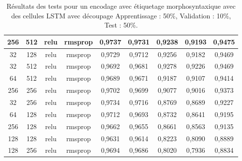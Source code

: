 \begin{table}[H]
{\begin{tabular}{|c|c|c|c|c|c|c|c|c|}
				256 & 512 & relu & rmsprop & 0,9737 & 0,9731 & 0,9238 & 0,9193 & 0,9475 \\ \hline
				32 & 128 & relu & rmsprop & 0,9729 & 0,9712 & 0,9256 & 0,9182 & 0,9469 \\ \hline
				32 & 512 & relu & rmsprop & 0,9692 & 0,9681 & 0,9278 & 0,9226 & 0,9469 \\ \hline
				64 & 512 & relu & rmsprop & 0,9689 & 0,9671 & 0,9187 & 0,9107 & 0,9414 \\ \hline
				256 & 256 & relu & rmsprop & 0,9702 & 0,9699 & 0,9077 & 0,9016 & 0,9373 \\ \hline
				32 & 256 & relu & rmsprop & 0,9734 & 0,9716 & 0,8769 & 0,8689 & 0,9227 \\ \hline
				64 & 128 & relu & rmsprop & 0,9712 & 0,9693 & 0,8732 & 0,8641 & 0,9195 \\ \hline
				256 & 128 & relu & rmsprop & 0,9662 & 0,9655 & 0,8661 & 0,8563 & 0,9135 \\ \hline
				128 & 128 & relu & rmsprop & 0,9631 & 0,9614 & 0,8223 & 0,8090 & 0,8889 \\ \hline
				128 & 256 & relu & rmsprop & 0,9694 & 0,9686 & 0,8020 & 0,7936 & 0,8834 \\ \hline
			\end{tabular}%
		}
		\caption{Résultats des tests pour un encodage avec étiquetage morphosyntaxique avec des cellules LSTM avec découpage Apprentissage : 50\%, Validation : 10\%, Test : 50\%.}
		\label{tab:lstm_2_postag}
	\end{table}

